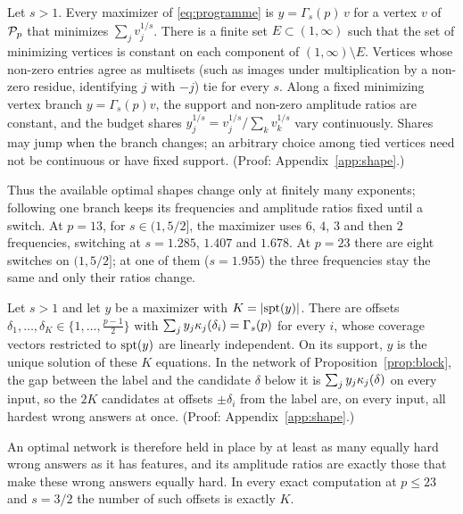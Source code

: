 \begin{proposition}\label{prop:shapes}
Let $s>1$. Every maximizer of \eqref{eq:programme} is $y=\Gamma_s(p)\,v$ for a vertex $v$ of $\mathcal{P}_p$ that minimizes $\sum_jv_j^{1/s}$. There is a finite set $E\subset(1,\infty)$ such that the set of minimizing vertices is constant on each component of $(1,\infty)\setminus E$. Vertices whose non-zero entries agree as multisets (such as images under multiplication by a non-zero residue, identifying $j$ with $-j$) tie for every $s$. Along a fixed minimizing vertex branch $y=\Gamma_s(p)v$, the support and non-zero amplitude ratios are constant, and the budget shares $y_j^{1/s}=v_j^{1/s}/\sum_kv_k^{1/s}$ vary continuously. Shares may jump when the branch changes; an arbitrary choice among tied vertices need not be continuous or have fixed support. (Proof: Appendix~\ref{app:shape}.)
\end{proposition}

Thus the available optimal shapes change only at finitely many exponents; following one branch keeps its frequencies and amplitude ratios fixed until a switch. At $p=13$, for $s\in(1,5/2]$, the maximizer uses $6$, $4$, $3$ and then $2$ frequencies, switching at $s=1.285$, $1.407$ and $1.678$. At $p=23$ there are eight switches on $(1,5/2]$; at one of them ($s=1.955$) the three frequencies stay the same and only their ratios change.

\begin{proposition}\label{prop:bottleneck}
Let $s>1$ and let $y$ be a maximizer with $K=|\mathrm{spt}(y)|$. There are offsets $\delta_1,\dots,\delta_K\in\{1,\dots,\frac{p-1}2\}$ with $\sum_jy_j\kappa_{j}(\delta_i)=\Gamma_s(p)$ for every $i$, whose coverage vectors restricted to $\mathrm{spt}(y)$ are linearly independent. On its support, $y$ is the unique solution of these $K$ equations. In the network of Proposition~\ref{prop:block}, the gap between the label and the candidate $\delta$ below it is $\sum_jy_j\kappa_{j}(\delta)$ on every input, so the $2K$ candidates at offsets $\pm\delta_i$ from the label are, on every input, all hardest wrong answers at once. (Proof: Appendix~\ref{app:shape}.)
\end{proposition}

An optimal network is therefore held in place by at least as many equally hard wrong answers as it has features, and its amplitude ratios are exactly those that make these wrong answers equally hard. In every exact computation at $p\le23$ and $s=3/2$ the number of such offsets is exactly $K$.

